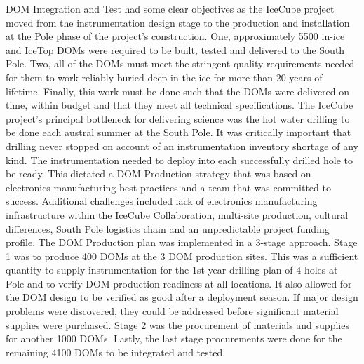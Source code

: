 DOM Integration and Test had some clear objectives as the IceCube project
moved from the instrumentation design stage to the production and
installation at the Pole phase of the project’s construction. One,
approximately 5500 in-ice and IceTop DOMs were required to be built, tested
and delivered to the South Pole. Two, all of the DOMs must meet the
stringent quality requirements needed for them to work reliably buried deep
in the ice for more than 20 years of lifetime. Finally, this work must be
done such that the DOMs were delivered on time, within budget and that they
meet all technical specifications. The IceCube project’s principal
bottleneck for delivering science was the hot water drilling to be done
each austral summer at the South Pole. It was critically important that
drilling never stopped on account of an instrumentation inventory shortage
of any kind. The instrumentation needed to deploy into each successfully
drilled hole to be ready. This dictated a DOM Production strategy that was
based on electronics manufacturing best practices and a team that was
committed to success. Additional challenges included lack of electronics
manufacturing infrastructure within the IceCube Collaboration, multi-site
production, cultural differences, South Pole logistics chain and an
unpredictable project funding profile. The DOM Production plan was
implemented in a 3-stage approach. Stage 1 was to produce 400 DOMs at the 3
DOM production sites. This was a sufficient quantity to supply
instrumentation for the 1st year drilling plan of 4 holes at Pole and to
verify DOM production readiness at all locations. It also allowed for the
DOM design to be verified as good after a deployment season. If major
design problems were discovered, they could be addressed before significant
material supplies were purchased. Stage 2 was the procurement of materials
and supplies for another 1000 DOMs. Lastly, the last stage procurements
were done for the remaining 4100 DOMs to be integrated and tested.

